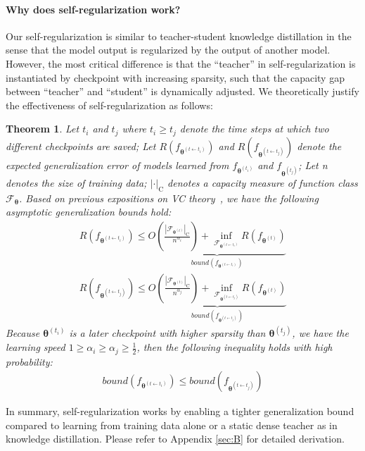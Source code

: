 \paragraph{Why does self-regularization work?}Our self-regularization is similar to teacher-student knowledge distillation in the sense that the model output is regularized by the output of another model. However, the most critical difference is that the ``teacher'' in self-regularization is instantiated by checkpoint with increasing sparsity, such that the capacity gap between ``teacher'' and ``student'' is dynamically adjusted. We theoretically justify the effectiveness of self-regularization as follows:
\newtheorem{theorem}{Theorem}
\begin{theorem}
	Let $t_i$ and $t_{j}$ where $t_{i}\geq t_{j}$ denote the time steps at which two different checkpoints are saved; Let $R(f_{\bm{\theta}^{(t\leftarrow t_i)}})$ and $R(f_{\bm{\theta}^{(t\leftarrow t_j)}})$ denote the expected generalization error of models learned from $f_{\bm{\theta}^{(t_i)}}$ and $f_{\bm{\theta}^{(t_j)}}$; Let n denotes the size of training data; $|\cdot|_{\text{C}}$ denotes a capacity measure of function class $\mathcal{F}_{\bm{\theta}}$. Based on previous expositions on VC theory~\cite{vc}, we have the following asymptotic generalization bounds hold:
	\begin{align}\nonumber
		R(f_{\bm{\theta}^{(t\leftarrow t_i)}})\leq \underbrace{O(\frac{|\mathcal{F}_{\bm{\theta}^{(t)}}|_{\text{C}}}{n^{\alpha_{i}}})+\underset{ \mathcal{F}_{\bm{\theta}^{(t\leftarrow t_i)}}}{\inf}R(f_{\bm{\theta}^{(t)}})}_{bound(f_{\bm{\theta}^{(t\leftarrow t_i)}})} \\
		R(f_{\bm{\theta}^{(t\leftarrow t_j)}})\leq \underbrace{O(\frac{|\mathcal{F}_{\bm{\theta}^{(t)}}|_{\text{C}}}{n^{\alpha_{j}}})+\underset{ \mathcal{F}_{\bm{\theta}^{(t\leftarrow t_j)}}}{\inf}R(f_{\bm{\theta}^{(t)}})}_{bound(f_{\bm{\theta}^{(t\leftarrow t_j)}})}  \nonumber
	\end{align}
Because $\bm{\theta}^{(t_i)}$ is a later checkpoint with higher sparsity than $\bm{\theta}^{(t_j)}$, we have the learning speed $1\geq \alpha_{i}\geq \alpha_{j}\geq \frac{1}{2}$, then the following inequality holds with high probability:
\begin{align}\nonumber
	bound(f_{\bm{\theta}^{(t\leftarrow t_i)}}) \leq bound(f_{\bm{\theta}^{(t\leftarrow t_j)}})
\end{align}
\end{theorem}
In summary, self-regularization works by enabling a tighter generalization bound compared to learning from training data alone or a static dense teacher as in knowledge distillation. Please refer to Appendix \ref{sec:B} for detailed derivation.
\label{sec:sr}

